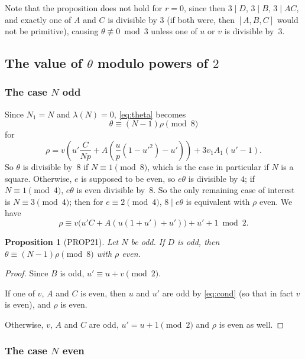 \documentclass[12pt,twoside,leqno]{article}
\newtheorem{proposition}[theorem]{Proposition}
\numberwithin{equation}{section}
\begin{document}
Note that the proposition does not hold for $r=0$, since then $3 \mid D$,
$3 \mid B$, $3 \mid AC$, and exactly one of $A$ and $C$ is divisible by $3$
(if both were, then $[A, B, C]$ would not be primitive), causing
$\theta\not\equiv 0\bmod 3$ unless one of $u$ or $v$ is divisible by~$3$.


\subsection{The value of \texorpdfstring {$\theta$}{theta} modulo
powers of \texorpdfstring {$2$}{2}}
\label {ssct:theta2}

\subsubsection{The case \texorpdfstring {$N$}{N} odd}
\label{ssct:Nodd}

Since $N_1=N$ and $\lambda (N) = 0$, \eqref{eq:theta} becomes
$$\theta \equiv (N-1) \rho \pmod 8$$
for
$$\rho = v \left(u' \frac{C}{Np} + A \left(\frac{u}{p} (1-{u}'^2)
- u'\right)\right) + 3 v_1 A_1 (u'-1).$$
So $\theta$ is divisible by~$8$ if $N \equiv 1\pmod 8$,
which is the case in particular if $N$ is a square.
Otherwise, $e$ is supposed to be even, so $e \theta$ is divisible
by $4$; if $N \equiv 1 \pmod 4$, $e \theta$ is even divisible by~$8$.
So the only remaining case of interest is $N \equiv 3 \pmod 4$;
then for $e \equiv 2 \pmod 4$, $8 \mid e \theta$ is equivalent with
$\rho$ even. We have
$$\rho \equiv v \big( u' C + A (u (1+u')+u') \big) + u'+1 \bmod 2.$$

\begin{proposition}[PROP21]\label{prop:Dodd}
Let $N$ be odd. If $D$ is odd, then $\theta \equiv (N-1) \rho \pmod 8$
with $\rho$ even.
\end{proposition}

\begin{proof}
Since $B$ is odd, $u' \equiv u+v \pmod 2$.

If one of $v$, $A$ and $C$ is even, then $u$ and $u'$ are odd by
\eqref {eq:cond} (so that in fact $v$ is even), and $\rho$ is even.

Otherwise, $v$, $A$ and $C$ are odd, $u' = u+1\pmod 2$ and
$\rho$ is even as well.
\end{proof}


\subsubsection{The case \texorpdfstring {$N$}{N} even}
\end{document}
